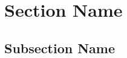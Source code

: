 \documentclass{article}
\begin{document}
\newpage
    \tableofcontents
\newpage

\section{Section Name}

\subsection{Subsection Name}
\end{document}
